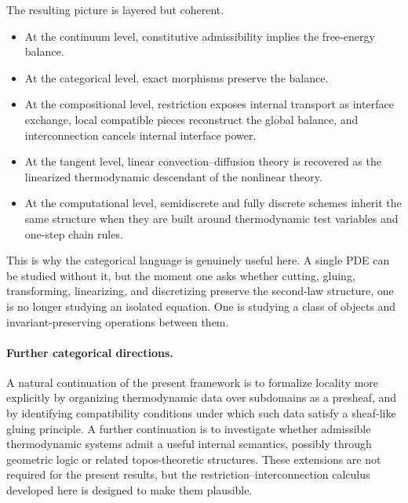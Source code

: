 \documentclass[11pt]{article}
\begin{document}
The resulting picture is layered but coherent.
\begin{itemize}[leftmargin=1.2cm]
    \item At the continuum level, constitutive admissibility implies the free-energy
    balance.
    \item At the categorical level, exact morphisms preserve the balance.
    \item At the compositional level, restriction exposes internal transport as
    interface exchange, local compatible pieces reconstruct the global balance, and
    interconnection cancels internal interface power.
    \item At the tangent level, linear convection--diffusion theory is recovered as
    the linearized thermodynamic descendant of the nonlinear theory.
    \item At the computational level, semidiscrete and fully discrete schemes inherit
    the same structure when they are built around thermodynamic test variables and
    one-step chain rules.
\end{itemize}

This is why the categorical language is genuinely useful here. A single PDE can be
studied without it, but the moment one asks whether cutting, gluing, transforming,
linearizing, and discretizing preserve the second-law structure, one is no longer
studying an isolated equation. One is studying a class of objects and
invariant-preserving operations between them.

\paragraph{Further categorical directions.}
A natural continuation of the present framework is to formalize locality more
explicitly by organizing thermodynamic data over subdomains as a presheaf, and by
identifying compatibility conditions under which such data satisfy a sheaf-like
gluing principle. A further continuation is to investigate whether admissible
thermodynamic systems admit a useful internal semantics, possibly through geometric
logic or related topos-theoretic structures. These extensions are not required for
the present results, but the restriction--interconnection calculus developed here is
designed to make them plausible.
\end{document}
